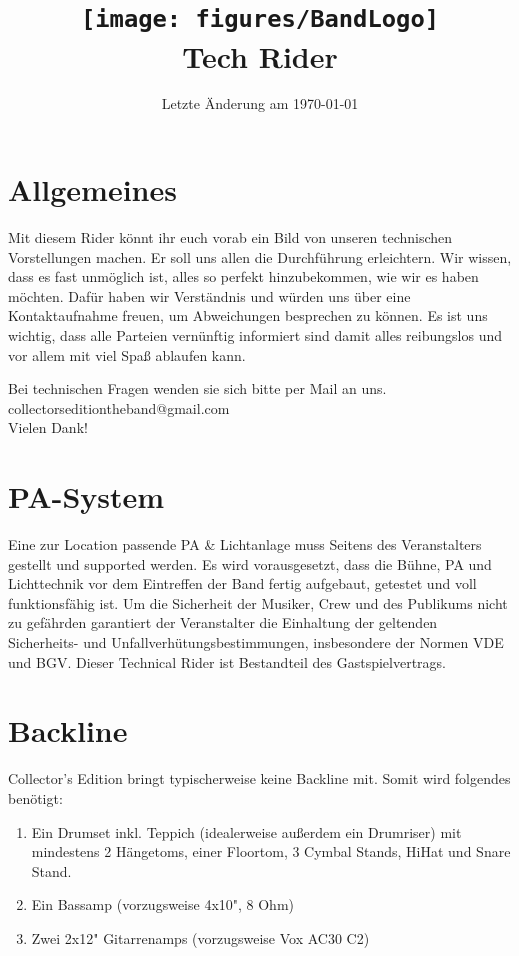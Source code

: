 \documentclass{article}
\title{\texttt{[image: figures/BandLogo]} \\Tech Rider}
\date{Letzte Änderung am \today}
\begin{document}
  \maketitle
  \thispagestyle{empty}

  \section*{Allgemeines}
  Mit diesem Rider könnt ihr euch vorab ein Bild von unseren technischen Vorstellungen machen.
   Er soll uns allen die Durchführung erleichtern. Wir wissen, dass es fast unmöglich ist, alles so
   perfekt hinzubekommen, wie wir es haben möchten. Dafür haben wir Verständnis und würden uns über eine
   Kontaktaufnahme freuen, um Abweichungen besprechen zu können. Es ist uns wichtig, dass alle Parteien
   vernünftig informiert sind damit alles reibungslos und vor allem mit viel Spaß ablaufen kann.

   Bei technischen Fragen wenden sie sich bitte per Mail an uns.\\
   collectorseditiontheband@gmail.com\\
   Vielen Dank!

  \section*{PA-System}

  Eine zur Location passende PA \& Lichtanlage muss Seitens des Veranstalters gestellt und supported
  werden. Es wird vorausgesetzt, dass die Bühne, PA und Lichttechnik vor dem Eintreffen der Band fertig
  aufgebaut, getestet und voll funktionsfähig ist. Um die Sicherheit der Musiker, Crew und des Publikums
  nicht zu gefährden garantiert der Veranstalter die Einhaltung der geltenden Sicherheits- und
  Unfallverhütungsbestimmungen, insbesondere der Normen VDE und BGV. Dieser Technical Rider ist
  Bestandteil des Gastspielvertrags.

  \section*{Backline}

  Collector's Edition bringt typischerweise keine Backline mit. Somit wird folgendes
  benötigt:

  \begin{enumerate}
  \item Ein Drumset inkl. Teppich (idealerweise außerdem ein Drumriser) mit
  mindestens 2 Hängetoms, einer Floortom, 3 Cymbal Stands, HiHat und Snare Stand.
  \item Ein Bassamp (vorzugsweise 4x10", 8 Ohm)
  \item Zwei 2x12" Gitarrenamps (vorzugsweise Vox AC30 C2)
  \end{enumerate}
\end{document}
